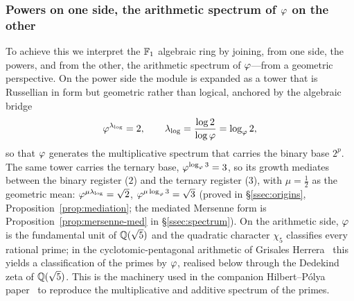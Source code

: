 \subsubsection{Powers on one side, the arithmetic spectrum of $\varphi$ on the other}
To achieve this we interpret the $\mathbb{F}_1$ algebraic ring by joining, from one side, the powers,
and from the other, the arithmetic spectrum of $\varphi$---from a geometric perspective. On
the power side the module is expanded as a tower that is Russellian in form but geometric
rather than logical, anchored by the algebraic bridge
\begin{equation}\label{eq:bridge}
\varphi^{\lambda_{\log}}=2,\qquad \lambda_{\log}=\frac{\log 2}{\log\varphi}=\log_{\varphi}2,
\end{equation}
so that $\varphi$ generates the multiplicative spectrum that carries the binary base $2^{p}$.
The same tower carries the ternary base, $\varphi^{\log_\varphi 3}=3$, so its growth mediates
between the binary register ($2$) and the ternary register ($3$), with $\mu=\tfrac12$ as the
geometric mean: $\varphi^{\mu\lambda_{\log}}=\sqrt2$, $\varphi^{\mu\log_\varphi 3}=\sqrt3$
(proved in \S\ref{ssec:origins}, Proposition~\ref{prop:mediation}; the mediated Mersenne form
is Proposition~\ref{prop:mersenne-med} in \S\ref{ssec:spectrum}). On the arithmetic side,
$\varphi$ is the fundamental unit of $\mathbb{Q}(\sqrt5)$ and the quadratic character $\chi_5$
classifies every rational prime; in the cyclotomic-pentagonal arithmetic of Grisales
Herrera~\cite{GrisalesHerrera} this yields a classification of the primes by $\varphi$,
realised below through the Dedekind zeta of $\mathbb{Q}(\sqrt5)$. This is the machinery used in the
companion Hilbert--P\'olya paper~\cite{HP} to reproduce the multiplicative and additive
spectrum of the primes.


